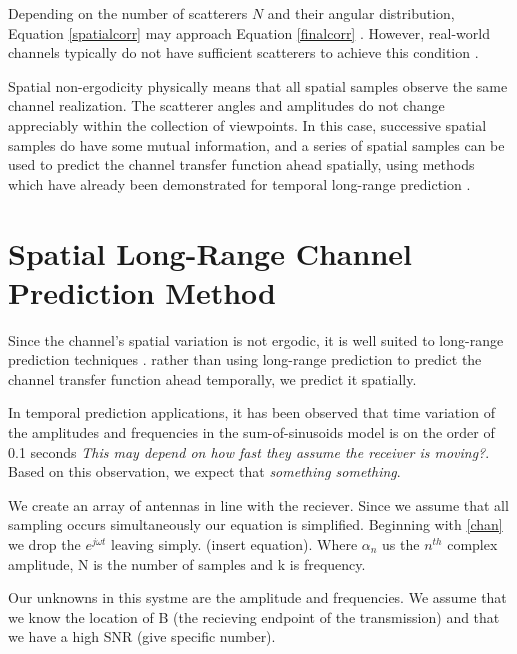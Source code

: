 \documentclass[11pt]{article} %
\begin{document}
Depending on the number of scatterers $N$ and their angular distribution, Equation \ref{spatialcorr} may approach Equation \ref{finalcorr} \cite{isukapalli2006}.  However, real-world channels typically do not have sufficient scatterers to achieve this condition \cite{duel-hallen2000}.  

Spatial non-ergodicity physically means that all spatial samples observe the same channel realization.  The scatterer angles and amplitudes do not change appreciably within the collection of viewpoints.  In this case, successive spatial samples do have some mutual information, and a series of spatial samples can be used to predict the channel transfer function ahead spatially, using methods which have already been demonstrated for temporal long-range prediction \cite{duel-hallen2000}.

\section{Spatial Long-Range Channel Prediction Method}\label{prediction}
Since the channel's spatial variation is not ergodic, it is well suited to long-range prediction techniques \cite{(someone, perhaps a duel-hallen paper, said this)}. rather than using long-range prediction to predict the channel transfer function ahead temporally, we predict it spatially. 

 In temporal prediction applications, it has been observed that time variation of the amplitudes and frequencies in the sum-of-sinusoids model is on the order of 0.1 seconds \cite{duel-hallen2007} \emph{This may depend on how fast they assume the receiver is moving?}.  Based on this observation, we expect that \emph{something something}.

We create an array of antennas in line with the reciever. Since we assume that all sampling occurs simultaneously our equation is simplified. Beginning with \ref{chan} we drop the $e^{j\omega t}$ leaving simply. (insert equation). Where $\alpha_n$ us the $n^{th}$ complex amplitude, N is the number of samples and k is frequency.

Our unknowns in this systme are the amplitude and frequencies. We assume that we know the location of B (the recieving endpoint of the transmission) and that we have a high SNR (give specific number).
\end{document}
